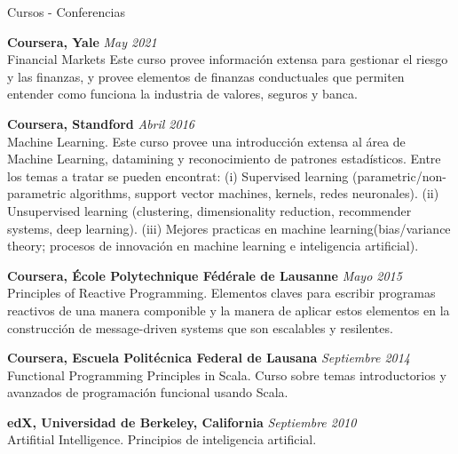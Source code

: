 \documentclass[spanish]{resume} %
\begin{document}
\begin{rSection}{Cursos - Conferencias}

{\bf Coursera, Yale} \hfill {\em May 2021} \\
Financial Markets
Este curso provee informaci\'on extensa para gestionar el riesgo y las finanzas, y provee elementos de finanzas conductuales que permiten entender como funciona la industria de valores, seguros y banca.

{\bf Coursera, Standford} \hfill {\em Abril 2016} \\
Machine Learning.
Este curso provee una introducción extensa al área de Machine Learning, datamining y reconocimiento de patrones estadísticos. Entre los temas a tratar se pueden encontrat: (i) Supervised learning (parametric/non-parametric algorithms, support vector machines, kernels, redes neuronales). (ii) Unsupervised learning (clustering, dimensionality reduction, recommender systems, deep learning). (iii) Mejores practicas en machine learning(bias/variance theory; procesos de innovación en machine learning e inteligencia artificial).

{\bf Coursera, \'Ecole Polytechnique F\'ed\'erale de Lausanne} \hfill {\em Mayo 2015} \\
Principles of Reactive Programming.
Elementos claves para escribir programas reactivos de una manera componible y la manera de aplicar estos elementos en la construcción de message-driven systems que son escalables y resilentes. 

{\bf Coursera, Escuela Polit\'ecnica Federal de Lausana} \hfill {\em Septiembre 2014} \\
Functional Programming Principles in Scala.
Curso sobre temas introductorios y avanzados de programaci\'on funcional usando Scala.

{\bf edX, Universidad de Berkeley, California} \hfill {\em Septiembre 2010} \\
Artifitial Intelligence.
Principios de inteligencia artificial.

\end{rSection}
\end{document}
